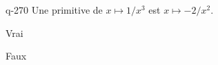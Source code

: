 \begin{truefalse}{q-270}
Une primitive de $x\mapsto 1/x^3$ est $x\mapsto -2/x^2$.
\item Vrai
\item* Faux
\end{truefalse}

